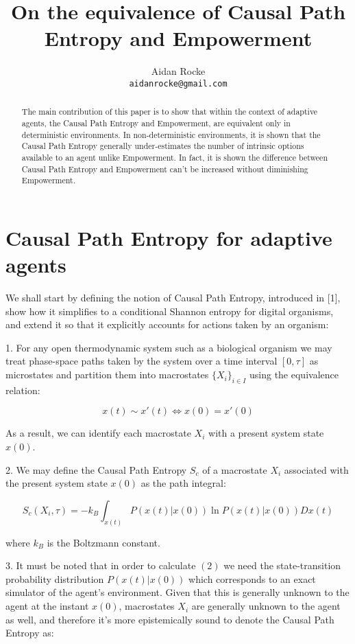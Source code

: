 \documentclass{article}
\title{On the equivalence of Causal Path Entropy and Empowerment}
\author{%
  Aidan Rocke\\
  \texttt{aidanrocke@gmail.com} \\
}
\begin{document}

\maketitle

\begin{abstract}
   The main contribution of this paper is to show that within the context of adaptive agents, the Causal Path Entropy and Empowerment, are equivalent only in deterministic environments. In non-deterministic environments, it is shown that the Causal Path Entropy generally under-estimates the number of intrinsic options available to an agent unlike Empowerment. In fact, it is shown the difference between Causal Path Entropy and Empowerment can't be increased without diminishing Empowerment. 
\end{abstract}

\section{Causal Path Entropy for adaptive agents}

We shall start by defining the notion of Causal Path Entropy, introduced in [1], show how it simplifies to a conditional Shannon entropy for digital organisms, and extend it so that it explicitly accounts for actions taken by an organism: 

1. For any open thermodynamic system such as a biological organism we may treat phase-space paths taken by the system over a time interval $[0,\tau]$ as microstates and partition them into macrostates $\{X_i\}_{i\in I}$ using the equivalence relation:

\begin{equation}
x(t) \sim x'(t) \iff x(0)=x'(0)	
\end{equation}

As a result, we can identify each macrostate $X_i$ with a present system state $x(0)$.

2. We may define the Causal Path Entropy $S_c$ of a macrostate $X_i$ associated with the present system state $x(0)$ as the path integral:

\begin{equation}
S_c(X_i,\tau)=-k_B \int_{x(t)} P(x(t)|x(0))\ln P(x(t)|x(0)) Dx(t)
\end{equation}

where $k_B$ is the Boltzmann constant. 

3. It must be noted that in order to calculate $(2)$ we need the state-transition probability distribution $P(x(t)|x(0))$ which corresponds to an exact simulator of the agent's environment. Given that this is generally unknown to the agent at the instant $x(0)$, macrostates $X_i$ are generally unknown to the agent as well, and therefore it's more epistemically sound to denote the Causal Path Entropy as:
\end{document}
